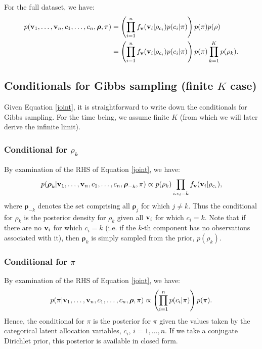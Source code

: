 \documentclass[fleqn,11pt]{wlscirep}
\begin{document}
For the full dataset, we have:
\begin{align}
p({\bf v}_1,\ldots, {\bf v}_n,c_1, \ldots, c_n, \boldsymbol{\rho}, \pi) &= \left(\prod_{i=1}^n f_{\bf v}({\bf v}_i | \rho_{c_i})p(c_i | \pi)\right)p(\pi)p(\rho)\\
&= \left(\prod_{i=1}^n f_{\bf v}({\bf v}_i | \rho_{c_i})p(c_i | \pi)\right)p(\pi)\prod_{k = 1}^K p(\rho_k).\label{joint}
\end{align}

\subsection{Conditionals for Gibbs sampling (finite $K$ case)}
Given Equation \eqref{joint}, it is straightforward to write down the conditionals for Gibbs sampling.  For the time being, we assume finite $K$ (from which we will later derive the infinite limit).  

\subsubsection{Conditional for $\rho_k$}
  By examination of the RHS of Equation \ref{joint}, we have:
\begin{equation}
p(\boldsymbol{\rho}_{k}| {\bf v}_1,\ldots, {\bf v}_n,c_1, \ldots, c_n, \boldsymbol{\rho}_{-k}, \pi) \propto p(\rho_k) \prod_{i: c_i = k} f_{\bf v}({\bf v}_i | \rho_{c_i}),\label{postparm}
\end{equation} 
where $\boldsymbol{\rho}_{-k}$ denotes the set comprising all $\boldsymbol{\rho}_{j}$ for which $j\ne k$.  Thus the conditional for $\rho_k$ is the posterior density for $\rho_k$ given all ${\bf v}_i$ for which $c_i = k$.  Note that if there are no ${\bf v}_i$ for which $c_i = k$ (i.e. if the $k$-th component has no observations associated with it), then $\boldsymbol{\rho}_{k}$ is simply sampled from the prior, $p(\rho_k)$.     

\subsubsection{Conditional for $\pi$}
  By examination of the RHS of Equation \ref{joint}, we have:
\begin{align}
p(\pi| {\bf v}_1,\ldots, {\bf v}_n,c_1, \ldots, c_n, \boldsymbol{\rho}, \pi) &\propto \left(\prod_{i=1}^n p(c_i | \pi)\right)p(\pi).\\
\end{align}
Hence, the conditional for $\pi$ is the posterior for $\pi$ given the values taken by the categorical latent allocation variables, $c_i$, $i = 1, \ldots, n$.  If we take a conjugate Dirichlet prior, this posterior is available in closed form.  
\end{document}
